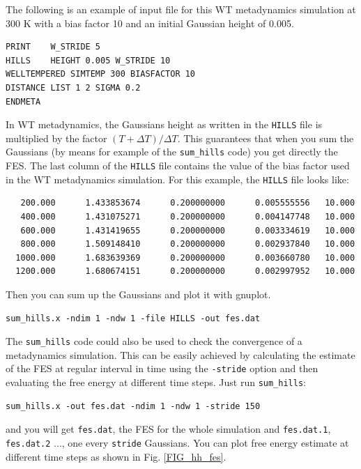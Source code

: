 \documentclass[12pt,a4paper]{article}
\begin{document}
The following is an example of input file for this WT metadynamics simulation at 300 K with a bias factor 10 and an initial Gaussian height of 0.005.

\begin{verbatim}
PRINT    W_STRIDE 5
HILLS    HEIGHT 0.005 W_STRIDE 10
WELLTEMPERED SIMTEMP 300 BIASFACTOR 10
DISTANCE LIST 1 2 SIGMA 0.2
ENDMETA
\end{verbatim}

In WT metadynamics, the Gaussians height as written in the \texttt{HILLS} file is multiplied by the factor $(T + \Delta T) / \Delta T$. This guarantees that when you sum the Gaussians (by means for example of the \texttt{sum\_hills} code) you get directly the FES. The last column of the \texttt{HILLS} file contains the value of the bias factor used in the WT metadynamics simulation. For this example, the \texttt{HILLS} file looks like:

\begin{verbatim}
   200.000      1.433853674      0.200000000      0.005555556   10.000 
   400.000      1.431075271      0.200000000      0.004147748   10.000 
   600.000      1.431419655      0.200000000      0.003334619   10.000 
   800.000      1.509148410      0.200000000      0.002937840   10.000 
  1000.000      1.683639369      0.200000000      0.003660780   10.000 
  1200.000      1.680674151      0.200000000      0.002997952   10.000 
\end{verbatim}

Then you can sum up the Gaussians and plot it with gnuplot.

\begin{verbatim}
sum_hills.x -ndim 1 -ndw 1 -file HILLS -out fes.dat
\end{verbatim}

The \texttt{sum\_hills} code could also be used to check the convergence of a metadynamics simulation. This can be easily achieved by calculating the estimate of the FES at regular interval in time using the \texttt{-stride} option and then evaluating the free energy at different time steps. Just run \texttt{sum\_hills}:

\begin{verbatim}
sum_hills.x -out fes.dat -ndim 1 -ndw 1 -stride 150
\end{verbatim}

and you will get \texttt{fes.dat}, the FES for the whole simulation and \texttt{fes.dat.1}, \texttt{fes.dat.2} ..., one every \texttt{stride} Gaussians. You can plot free energy estimate at different time steps as shown in Fig. \ref{FIG_hh_fes}.
\end{document}

